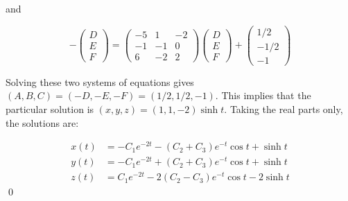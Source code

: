 \documentclass[12pt]{article}
\begin{document}
and

\begin{equation}
    -\begin{pmatrix}
        D \\
        E \\
        F
    \end{pmatrix}
    =
    \begin{pmatrix}
        -5 & 1  & -2 \\
        -1 & -1 & 0  \\
        6  & -2 & 2
    \end{pmatrix}
    \begin{pmatrix}
        D \\
        E \\
        F
    \end{pmatrix}
    +
    \begin{pmatrix}
        1/2  \\
        -1/2 \\
        -1
    \end{pmatrix}
\end{equation}

Solving these two systems of equations gives $(A, B, C) = (-D, -E, -F) = (1/2, 1/2, -1)$. This implies that the particular solution is $(x, y, z) = (1, 1, -2)\sinh{t}$. Taking the real parts only, the solutions are:

\begin{equation}
    \begin{split}
        x(t) &= -C_{1} e^{-2t} - (C_{2} + C_{3}) e^{-t} \cos{t} + \sinh{t} \\
        y(t) &= -C_{1} e^{-2t} + (C_{2} + C_{3}) e^{-t} \cos{t} + \sinh{t} \\
        z(t) &= C_{1} e^{-2t} - 2(C_{2} - C_{3}) e^{-t} \cos{t} - 2 \sinh{t}
    \end{split}
\end{equation}
\qed

\pagebreak
\section*{}


\problem{}{}
\end{document}
